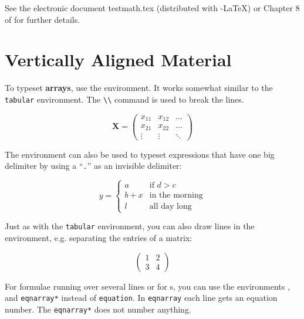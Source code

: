 See the electronic document testmath.tex (distributed with
\AmS-\LaTeX) or Chapter 8 of \companion{} for further details.

\section{Vertically Aligned Material}
\label{sec:vert}

To typeset \textbf{arrays}, use the  environment. It works
somewhat similar to the \texttt{tabular} environment. The \verb|\\| command is
used to break the lines.
\begin{example}
\begin{displaymath}
\mathbf{X} =
\left( \begin{array}{ccc}
x_{11} & x_{12} & \ldots \\
x_{21} & x_{22} & \ldots \\
\vdots & \vdots & \ddots
\end{array} \right)
\end{displaymath}
\end{example}

The  environment can also be used to typeset expressions that have one
big delimiter by using a ``\verb|.|'' as an invisible  
delimiter:
\begin{example}
\begin{displaymath}
y = \left\{ \begin{array}{ll}
 a & \textrm{if $d>c$}\\
 b+x & \textrm{in the morning}\\
 l & \textrm{all day long}
  \end{array} \right.
\end{displaymath}
\end{example}

Just as with the \verb|tabular| environment, you can also
draw lines in the  environment, e.g. separating the entries of
a matrix:
\begin{example}
\begin{displaymath}
\left(\begin{array}{c|c}
 1 & 2 \\
\hline
3 & 4
\end{array}\right)
\end{displaymath}
\end{example}



For formulae running over several lines or for s,
you can use the environments , and \verb|eqnarray*|
instead of \texttt{equation}. In \texttt{eqnarray} each line gets an
equation number. The \verb|eqnarray*| does not number anything.

